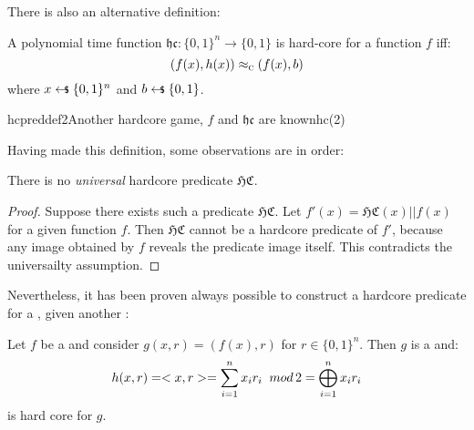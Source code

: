 There is also an alternative definition:
\begin{defn}
    A polynomial time function $\mathfrak{hc} : \{0,1\}^n \to \{0,1\}$ is hard-core for  a function $f$ iff:
    \begin{equation*}
        (f(x), h(x)) \approx_\textsc{c} (f(x), b)
    \end{equation*}
    where $x \pickUAR \{0, 1\}^n$ and $b \pickUAR \{0, 1\}$.
\end{defn}


\begin{cryptogame}{hcpreddef2}{Another hardcore game, $f$ and $\mathfrak{hc}$ are known}{hc(2)}
    \cseqdelay

    \cseqdelay
    \cseqdelay

\end{cryptogame}


Having made this definition, some observations are in order:

\begin{clm}
    There is no \textit{universal} hardcore predicate $\mathfrak{HC}$.
\end{clm}

\begin{proof}
    Suppose there exists such a predicate $\mathfrak{HC}$. Let $f'(x) = \mathfrak{HC}(x) || f(x)$ for a given function $f$. Then $\mathfrak{HC}$ cannot be a hardcore predicate of $f'$, because any image obtained by $f$ reveals the predicate image itself. This contradicts the universailty assumption.
\end{proof}

Nevertheless, it has been proven always possible to construct a hardcore predicate for a \owf{}, given another \owf:

\begin{theorem}
    Let $f$ be a \owf{} and consider $g(x,r)=(f(x), r)$ for $r \in \{0,1\}^{n}$.
    Then $g$ is a \owf{} and:
    \begin{equation*}
        h(x,r) = <x, r> = \sum_{i=1}^{n}x_ir_i\;\; mod\, 2 = \bigoplus_{i=1}^{n}x_ir_i
    \end{equation*}
    is hard core for $g$.
\end{theorem}

